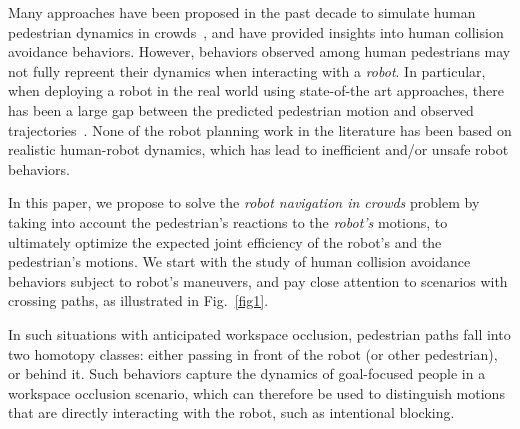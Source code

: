 \documentclass[conference]{IEEEtran}
\begin{document}
Many approaches have been proposed in the 
past decade to simulate human pedestrian dynamics in crowds~\cite{helbing1995social,lamarche2004crowd, 
karamouzas2009predictive}, and have provided insights into human collision avoidance behaviors.
However, 
behaviors observed among human pedestrians may not fully 
repreent their dynamics when interacting with a \emph{robot}. 
In particular, when deploying a robot in the real world using state-of-the art approaches, there has been a 
large gap between the predicted pedestrian motion and observed trajectories~\cite{trautman2015robot,pfeiffer2016predicting}. 
None of the robot planning work in the literature has been based on realistic human-robot dynamics,
 which has lead to inefficient and/or unsafe robot behaviors.

In this paper, we propose to solve the \emph{robot navigation 
in crowds} problem by taking into account the pedestrian's reactions to the 
\emph{robot's} motions, to ultimately optimize the expected joint efficiency 
of the robot's and the pedestrian's motions. We start with the study of human 
collision avoidance behaviors subject to robot's maneuvers, and pay close 
attention to scenarios with crossing paths, as illustrated in Fig.~\ref{fig1}.

In such situations with anticipated workspace occlusion,
pedestrian paths fall into two homotopy classes: either passing in front of the 
robot (or other pedestrian), or behind it. Such behaviors capture the dynamics of 
goal-focused people in a workspace occlusion scenario, which can therefore 
be used to distinguish motions that are directly interacting with the robot, such as 
intentional blocking.




\end{document}
